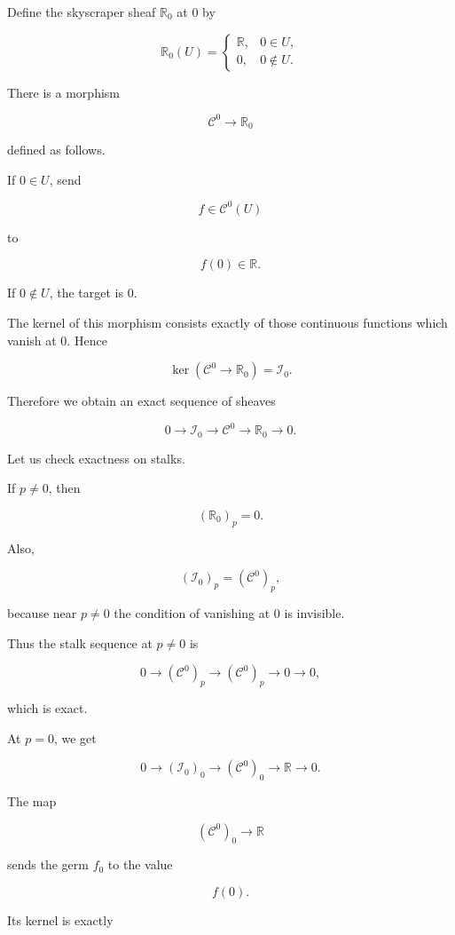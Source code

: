 \documentclass[12pt,a4paper]{article}
\theoremstyle{notespace}
\newcommand{\C}{\mathcal C}
\newcommand{\I}{\mathcal I}
\begin{document}
	Define the skyscraper sheaf $\mathbb R_0$ at $0$ by
	
	\[
	\mathbb R_0(U)
	=
	\begin{cases}
		\mathbb R, & 0\in U,\\
		0, & 0\notin U.
	\end{cases}
	\]
	
	There is a morphism
	
	\[
	\C^0\to \mathbb R_0
	\]
	
	defined as follows.
	
	If $0\in U$, send
	
	\[
	f\in \C^0(U)
	\]
	
	to
	
	\[
	f(0)\in \mathbb R.
	\]
	
	If $0\notin U$, the target is $0$.
	
	The kernel of this morphism consists exactly of those continuous functions
	which vanish at $0$. Hence
	
	\[
	\ker(\C^0\to \mathbb R_0)=\I_0.
	\]
	
	Therefore we obtain an exact sequence of sheaves
	
	\[
	0
	\longrightarrow
	\I_0
	\longrightarrow
	\C^0
	\longrightarrow
	\mathbb R_0
	\longrightarrow
	0.
	\]
	
	Let us check exactness on stalks.
	
	If $p\neq 0$, then
	
	\[
	(\mathbb R_0)_p=0.
	\]
	
	Also,
	
	\[
	(\I_0)_p=(\C^0)_p,
	\]
	
	because near $p\neq 0$ the condition of vanishing at $0$ is invisible.
	
	Thus the stalk sequence at $p\neq 0$ is
	
	\[
	0
	\longrightarrow
	(\C^0)_p
	\longrightarrow
	(\C^0)_p
	\longrightarrow
	0
	\longrightarrow
	0,
	\]
	
	which is exact.
	
	At $p=0$, we get
	
	\[
	0
	\longrightarrow
	(\I_0)_0
	\longrightarrow
	(\C^0)_0
	\longrightarrow
	\mathbb R
	\longrightarrow
	0.
	\]
	
	The map
	
	\[
	(\C^0)_0\to\mathbb R
	\]
	
	sends the germ $f_0$ to the value
	
	\[
	f(0).
	\]
	
	Its kernel is exactly
	
\end{document}

